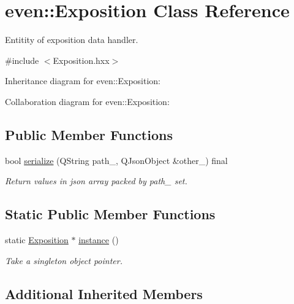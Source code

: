 \hypertarget{classeven_1_1_exposition}{}\section{even\+:\+:Exposition Class Reference}
\label{classeven_1_1_exposition}


Entitity of exposition data handler.  




{\ttfamily \#include $<$Exposition.\+hxx$>$}



Inheritance diagram for even\+:\+:Exposition\+:


Collaboration diagram for even\+:\+:Exposition\+:
\subsection*{Public Member Functions}
\begin{DoxyCompactItemize}
\item 
\mbox{\label{classeven_1_1_exposition_a3a2cb49fbe537beca6987226ecec7c07}} 
bool \mbox{\hyperlink{classeven_1_1_exposition_a3a2cb49fbe537beca6987226ecec7c07}{serialize}} (Q\+String path\+\_\+, Q\+Json\+Object \&other\+\_\+) final
\begin{DoxyCompactList}\small\item\em Return values in json array packed by path\+\_\+ set. \end{DoxyCompactList}\end{DoxyCompactItemize}
\subsection*{Static Public Member Functions}
\begin{DoxyCompactItemize}
\item 
\mbox{\label{classeven_1_1_exposition_affb84768fd2951e3c34710afc7c74e36}} 
static \mbox{\hyperlink{classeven_1_1_exposition}{Exposition}} $\ast$ \mbox{\hyperlink{classeven_1_1_exposition_affb84768fd2951e3c34710afc7c74e36}{instance}} ()
\begin{DoxyCompactList}\small\item\em Take a singleton object pointer. \end{DoxyCompactList}\end{DoxyCompactItemize}
\subsection*{Additional Inherited Members}


